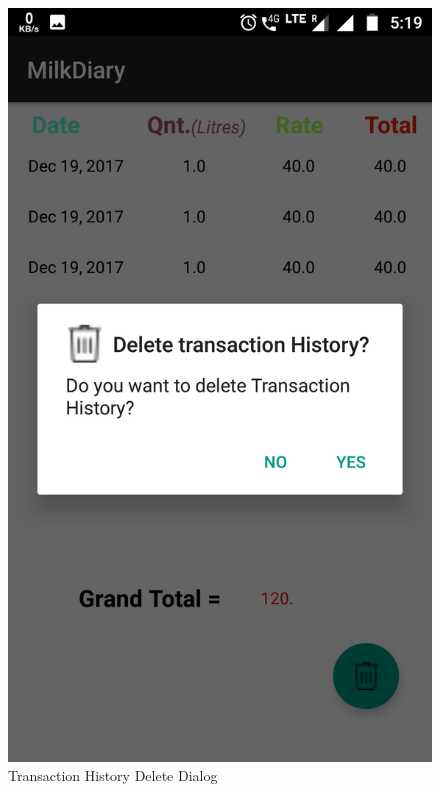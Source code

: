 \begin{figure}[h]
	\centering
	\includegraphics[width=0.7\linewidth]{s11}
	\caption{Transaction History Delete Dialog}
\end{figure}
\begin{text}
	\\
	\\
	\\
	\\
\end{text}

